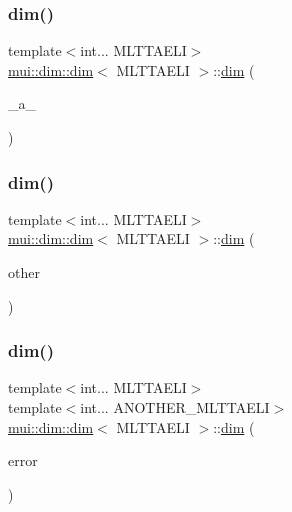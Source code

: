 \subsubsection{\texorpdfstring{dim()}{dim()}\hspace{0.1cm}{\footnotesize\ttfamily [2/4]}}
{\footnotesize\ttfamily template$<$int... M\+L\+T\+T\+A\+E\+LI$>$ \\
\hyperlink{structmui_1_1dim_1_1dim}{mui\+::dim\+::dim}$<$ M\+L\+T\+T\+A\+E\+LI $>$\+::\hyperlink{structmui_1_1dim_1_1dim}{dim} (\begin{DoxyParamCaption}\item[{double}]{\+\_\+a\+\_\+ }\end{DoxyParamCaption})\hspace{0.3cm}{\ttfamily [inline]}}

\mbox{\label{structmui_1_1dim_1_1dim_a740a39809e358db97b0c1a00317e678f}} 
\subsubsection{\texorpdfstring{dim()}{dim()}\hspace{0.1cm}{\footnotesize\ttfamily [3/4]}}
{\footnotesize\ttfamily template$<$int... M\+L\+T\+T\+A\+E\+LI$>$ \\
\hyperlink{structmui_1_1dim_1_1dim}{mui\+::dim\+::dim}$<$ M\+L\+T\+T\+A\+E\+LI $>$\+::\hyperlink{structmui_1_1dim_1_1dim}{dim} (\begin{DoxyParamCaption}\item[{const \hyperlink{structmui_1_1dim_1_1dim}{dim}$<$ M\+L\+T\+T\+A\+E\+LI $>$ \&}]{other }\end{DoxyParamCaption})\hspace{0.3cm}{\ttfamily [inline]}}

\mbox{\label{structmui_1_1dim_1_1dim_aef3b03be0f2d4385d189eb02675a2a16}} 
\subsubsection{\texorpdfstring{dim()}{dim()}\hspace{0.1cm}{\footnotesize\ttfamily [4/4]}}
{\footnotesize\ttfamily template$<$int... M\+L\+T\+T\+A\+E\+LI$>$ \\
template$<$int... A\+N\+O\+T\+H\+E\+R\+\_\+\+M\+L\+T\+T\+A\+E\+LI$>$ \\
\hyperlink{structmui_1_1dim_1_1dim}{mui\+::dim\+::dim}$<$ M\+L\+T\+T\+A\+E\+LI $>$\+::\hyperlink{structmui_1_1dim_1_1dim}{dim} (\begin{DoxyParamCaption}\item[{const \hyperlink{structmui_1_1dim_1_1dim}{dim}$<$ A\+N\+O\+T\+H\+E\+R\+\_\+\+M\+L\+T\+T\+A\+E\+L\+I... $>$ \&}]{error }\end{DoxyParamCaption})\hspace{0.3cm}{\ttfamily [inline]}}



